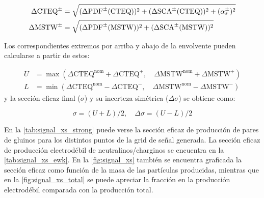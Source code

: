 \begin{align}
  \Delta\mathrm{CTEQ}^{\pm} &= \sqrt{(\Delta\mathrm{PDF}^{\pm}(\mathrm{CTEQ}))^2 + (\Delta\mathrm{SCA}^{\pm}(\mathrm{CTEQ}))^2 + (\alpha_s^{\pm})^2} \\
  \Delta\mathrm{MSTW}^{\pm} &= \sqrt{(\Delta\mathrm{PDF}^{\pm}(\mathrm{MSTW}))^2 + (\Delta\mathrm{SCA}^{\pm}(\mathrm{MSTW}))^2}
\end{align}

Los correspondientes extremos por arriba y abajo de la envolvente pueden calcularse a partir de estos:

\begin{align}
  U &= \max(\Delta\mathrm{CTEQ}^\mathrm{nom} + \Delta\mathrm{CTEQ}^{+},\quad \Delta\mathrm{MSTW}^\mathrm{nom} + \Delta\mathrm{MSTW}^{+}) \\
  L &= \min(\Delta\mathrm{CTEQ}^\mathrm{nom} - \Delta\mathrm{CTEQ}^{-},\quad \Delta\mathrm{MSTW}^\mathrm{nom} - \Delta\mathrm{MSTW}^{-})
\end{align}
%
y la sección eficaz final ($\sigma$) y su incerteza simétrica ($\Delta\sigma$) se obtiene como:

\begin{equation}
  \sigma = (U+L)/2,\quad \Delta\sigma = (U-L)/2
\end{equation}


En la \cref{tab:signal_xs_strong} puede verse la sección eficaz de producción de
pares de gluinos para los distintos puntos de la grid de señal generada. La
sección eficaz de producción electrodébil de neutralinos/charginos se encuentra en la
\cref{tab:signal_xs_ewk}. En la \cref{fig:signal_xs} también se encuentra
graficada la sección eficaz como función de la masa de las partículas
producidas, mientras que en la \cref{fig:signal_xs_total} se puede apreciar la
fracción en la producción electrodébil comparada con la producción total.

